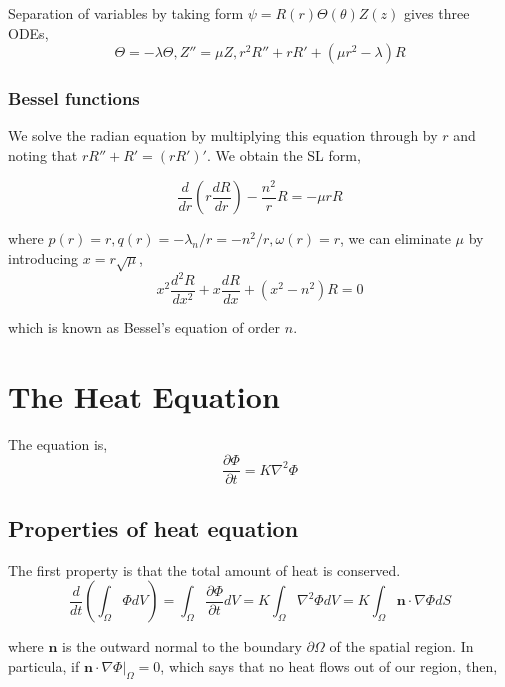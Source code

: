 \documentclass{article}
\theoremstyle{definition}
\begin{document}
Separation of variables by taking form $\psi=R(r)\Theta(\theta)Z(z)$ gives three ODEs,
\begin{equation}
\Theta = -\lambda \Theta, Z''=\mu Z, r^2R''+rR'+(\mu r^2-\lambda)R
\end{equation}



\subsubsection{Bessel functions}

We solve the radian equation by multiplying this equation through by $r$ and noting that $rR''+R'=(rR')'$. We obtain the SL form,

\begin{equation}
\frac{d}{dr}\left(r\frac{dR}{dr}\right)-\frac{n^2}{r}R=-\mu r R
\end{equation}

where $p(r)=r, q(r)=-\lambda_n/r=-n^2/r, \omega(r)=r$, we can eliminate $\mu$ by introducing $x=r\sqrt{\mu}$,
\begin{equation}
x^2\frac{d^2R}{dx^2}+x\frac{dR}{dx}+(x^2-n^2)R=0
\end{equation}

which is known as Bessel's equation of order $n$.

\section{The Heat Equation}
The equation is,
\begin{equation}
\frac{\partial \Phi}{\partial t}=K\nabla^2\Phi
\end{equation}


\subsection{Properties of heat equation}
The first property is that the total amount of heat is conserved.
\begin{equation}
\frac{d}{dt}\left(\int_{\Omega} \Phi dV\right)=\int_{\Omega}\frac{\partial \Phi}{\partial t}dV=K\int_{\Omega} \nabla^2 \Phi dV=K\int_{\Omega} \mathbf{n} \cdot \nabla \Phi dS
\end{equation}

where $\mathbf{n}$ is the outward normal to the boundary $\partial \Omega$ of the spatial region. In particula, if $\mathbf{n} \cdot \nabla \Phi |_{\Omega}=0$, which says that no heat flows out of our region, then,
\end{document}
